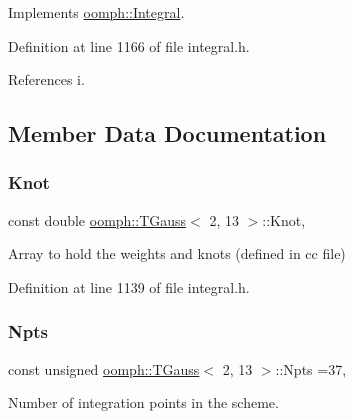 Implements \hyperlink{classoomph_1_1Integral_ac65335e2aab120b285b3d6c294507b06}{oomph\+::\+Integral}.



Definition at line 1166 of file integral.\+h.



References i.



\subsection{Member Data Documentation}
\mbox{\label{classoomph_1_1TGauss_3_012_00_0113_01_4_aada0c51d07de4719c34d0d554bc9662d}} 
\subsubsection{\texorpdfstring{Knot}{Knot}}
{\footnotesize\ttfamily const double \hyperlink{classoomph_1_1TGauss}{oomph\+::\+T\+Gauss}$<$ 2, 13 $>$\+::Knot\hspace{0.3cm}{\ttfamily [static]}, {\ttfamily [private]}}



Array to hold the weights and knots (defined in cc file) 



Definition at line 1139 of file integral.\+h.

\mbox{\label{classoomph_1_1TGauss_3_012_00_0113_01_4_a1f22b664968ea48225bec386d8c70efe}} 
\subsubsection{\texorpdfstring{Npts}{Npts}}
{\footnotesize\ttfamily const unsigned \hyperlink{classoomph_1_1TGauss}{oomph\+::\+T\+Gauss}$<$ 2, 13 $>$\+::Npts =37\hspace{0.3cm}{\ttfamily [static]}, {\ttfamily [private]}}



Number of integration points in the scheme. 



